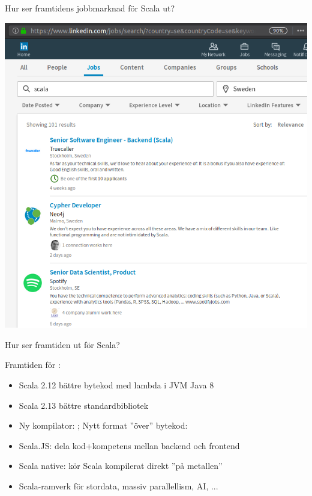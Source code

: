\begin{Slide}{Hur ser framtidens jobbmarknad för Scala ut?}
\begin{minipage}{1.0\textwidth}
\begin{minipage}{0.48\textwidth}
\includegraphics[width=1.2\textwidth]{../img/w14/scala-jobs-sweden-linkedin-2017-dec07.png}
\end{minipage}
\end{minipage}
\end{Slide}


\begin{Slide}{Hur ser framtiden ut för Scala?}\SlideFontSmall

Framtiden för :
\begin{itemize}
\item Scala 2.12 bättre bytekod med lambda i JVM Java 8
\item Scala 2.13 bättre standardbibliotek
\item Ny kompilator: ; Nytt format ''över'' bytekod: 
\item Scala.JS: dela kod+kompetens mellan backend och frontend
\item Scala native: kör Scala kompilerat direkt ''på metallen''
\item Scala-ramverk för stordata, massiv parallellism, AI, ...
\end{itemize}
\end{Slide}


